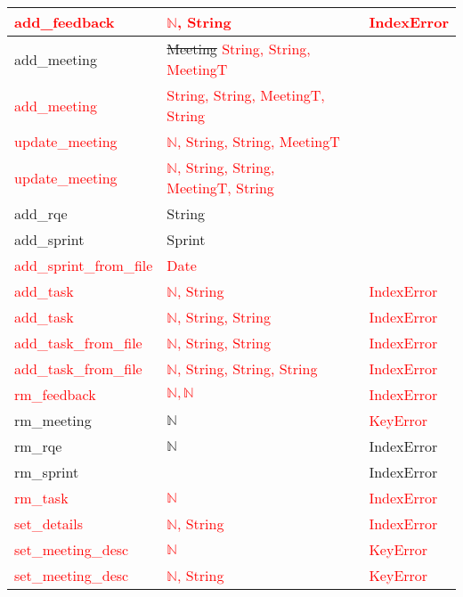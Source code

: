 \documentclass[12pt, titlepage]{article}
\begin{document}
\begin{tabular}{|l|l|l|l|}
    \hline
    \textcolor{red}{add\_feedback} & \textcolor{red}{$\mathbb{N}$, String} & & \textcolor{red}{IndexError}\\
    \hline
    add\_meeting & \sout{Meeting} \textcolor{red}{String, String, MeetingT}& & \\
    \hline
    \textcolor{red}{add\_meeting} & \textcolor{red}{String, String, MeetingT, String}& & \\
    \hline
    \textcolor{red}{update\_meeting} & \textcolor{red}{$\mathbb{N}$, String, String, MeetingT}& & \\
    \hline
    \textcolor{red}{update\_meeting} & \textcolor{red}{$\mathbb{N}$, String, String, MeetingT, String}& & \\
    \hline
    add\_rqe & String & & \\
    \hline
    add\_sprint & Sprint & & \\
    \hline
    \textcolor{red}{add\_sprint\_from\_file} & \textcolor{red}{Date} & & \\
    \hline
    \textcolor{red}{add\_task} & \textcolor{red}{$\mathbb{N}$, String}& & \textcolor{red}{IndexError}\\
    \hline
    \textcolor{red}{add\_task} & \textcolor{red}{$\mathbb{N}$, String, String}& & \textcolor{red}{IndexError}\\
    \hline
    \textcolor{red}{add\_task\_from\_file} & \textcolor{red}{$\mathbb{N}$, String, String} & & \textcolor{red}{IndexError}\\
    \hline
    \textcolor{red}{add\_task\_from\_file} & \textcolor{red}{$\mathbb{N}$, String, String, String} & & \textcolor{red}{IndexError}\\
    \hline
    \textcolor{red}{rm\_feedback} & \textcolor{red}{$\mathbb{N,N}$} & & \textcolor{red}{IndexError}\\
    \hline
    rm\_meeting & $\mathbb{N}$ &  & \textcolor{red}{KeyError}\\
    \hline
    rm\_rqe & $\mathbb{N}$ &  & IndexError\\
    \hline
    rm\_sprint & & & IndexError\\
    \hline
    \textcolor{red}{rm\_task} & \textcolor{red}{$\mathbb{N}$} & & \textcolor{red}{IndexError}\\
    \hline
    \textcolor{red}{set\_details} & \textcolor{red}{$\mathbb{N}$, String} & & \textcolor{red}{IndexError}\\
    \hline
    \textcolor{red}{set\_meeting\_desc} & \textcolor{red}{$\mathbb{N}$} & & \textcolor{red}{KeyError}\\
    \hline
    \textcolor{red}{set\_meeting\_desc} & \textcolor{red}{$\mathbb{N}$, String} & &\textcolor{red}{KeyError}\\
    \hline
\end{tabular}
\end{document}
